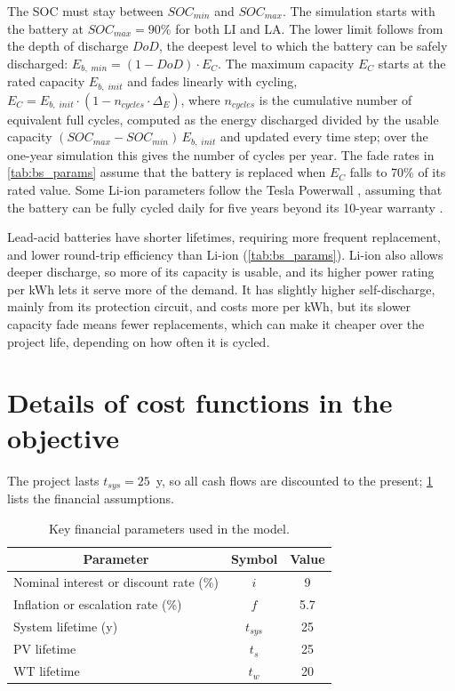 \documentclass[final,3p,times]{elsarticle}
\begin{document}
The SOC must stay between $SOC_{min}$ and $SOC_{max}$. The simulation starts with the battery at $SOC_{max} = 90\%$ for both LI and LA. The lower limit follows from the depth of discharge $DoD$, the deepest level to which the battery can be safely discharged: $E_{b,\;min} = (1 - DoD)\cdot E_C$. The maximum capacity $E_C$ starts at the rated capacity $E_{b,\; init}$ and fades linearly with cycling, $E_C = E_{b,\; init} \cdot (1 - n_{cycles}\cdot \Delta_E)$, where $n_{cycles}$ is the cumulative number of equivalent full cycles, computed as the energy discharged divided by the usable capacity $(SOC_{max}-SOC_{min})\,E_{b,\;init}$ and updated every time step; over the one-year simulation this gives the number of cycles per year. The fade rates in \cref{tab:bs_params} assume that the battery is replaced when $E_C$ falls to 70\% of its rated value.
Some Li-ion parameters follow the Tesla Powerwall \cite{powerwall}, assuming that the battery can be fully cycled daily for five years beyond its 10-year warranty \cite{bs_source}.

Lead-acid batteries have shorter lifetimes, requiring more frequent replacement, and lower round-trip efficiency than Li-ion (\cref{tab:bs_params}). Li-ion also allows deeper discharge, so more of its capacity is usable, and its higher power rating per kWh lets it serve more of the demand. It has slightly higher self-discharge, mainly from its protection circuit, and costs more per kWh, but its slower capacity fade means fewer replacements, which can make it cheaper over the project life, depending on how often it is cycled.

\section{Details of cost functions in the objective \label{app:costs}}

The project lasts $t_{sys} = 25$~y, so all cash flows are discounted to the present; \cref{tab:financial} lists the financial assumptions.

\begin{table}[htbp]
\centering
\begin{tabular}{@{}lcc@{}}
\toprule
\multicolumn{1}{c}{\textbf{Parameter}} & \textbf{Symbol}      & \textbf{Value}       \\ \midrule
Nominal interest or discount rate (\%) & $i$                    & 9 \cite{interest_rate}                   \\
Inflation or escalation rate (\%)                    & $f$                    & 5.7 \cite{inflation_rate}                 \\
System lifetime (y)                    & $t_{sys}$           & 25   \\
PV lifetime & $t_s$ & 25 \\
WT lifetime & $t_w$ & 20 \\
\bottomrule
\end{tabular}
\caption{Key financial parameters used in the model.}
\label{tab:financial} 
\end{table}
\end{document}

